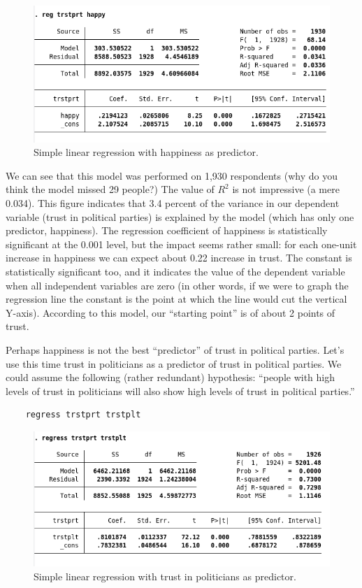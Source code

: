 \begin{figure}[H]
	\includegraphics[width=\linewidth]{./img/reg1.png}
	\caption{Simple linear regression with happiness as predictor.}
\end{figure}

We can see that this model was performed on 1,930 respondents (why do you think the model missed 29 people?) The value of $R^2$ is not impressive (a mere 0.034). This figure indicates that 3.4 percent of the variance in our dependent variable (trust in political parties) is explained by the model (which has only one predictor, happiness). The regression coefficient of happiness is statistically significant at the 0.001 level, but the impact seems rather small: for each one-unit increase in happiness we can expect about 0.22 increase in trust. The constant is statistically significant too, and it indicates the value of the dependent variable when all independent variables are zero (in other words, if we were to graph the regression line the constant is the point at which the line would cut the vertical Y-axis). According to this model, our ``starting point'' is of about 2 points of trust.

Perhaps happiness is not the best ``predictor'' of trust in political parties. Let's use this time trust in politicians as a predictor of trust in political parties. We could assume the following (rather redundant) hypothesis: ``people with high levels of trust in politicians will also show high levels of trust in political parties.''

\begin{lstlisting}
	regress trstprt trstplt
\end{lstlisting}

\begin{figure}[H]
	\includegraphics[width=\linewidth]{./img/reg2.png}
	\caption{Simple linear regression with trust in politicians as predictor.}
\end{figure}

